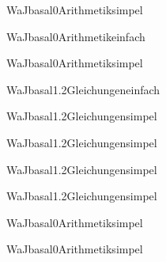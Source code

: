 \documentclass[12pt]{article}
\begin{document}
\begin{Add}{WaJ}{basal0}{Arithmetik}{simpel}
\end{Add}

\begin{Add}{WaJ}{basal0}{Arithmetik}{einfach}
\end{Add}

\begin{Add}{WaJ}{basal0}{Arithmetik}{simpel}
\end{Add}

\begin{Add}{WaJ}{basal1.2}{Gleichungen}{einfach}
\end{Add}

\begin{Add}{WaJ}{basal1.2}{Gleichungen}{simpel}
\end{Add}

\begin{Add}{WaJ}{basal1.2}{Gleichungen}{simpel}
\end{Add}

\begin{Add}{WaJ}{basal1.2}{Gleichungen}{simpel}
\end{Add}

\begin{Add}{WaJ}{basal1.2}{Gleichungen}{simpel}
\end{Add}

\begin{Add}{WaJ}{basal0}{Arithmetik}{simpel}
\end{Add}

\begin{Add}{WaJ}{basal0}{Arithmetik}{simpel}
\end{Add}
\end{document}
